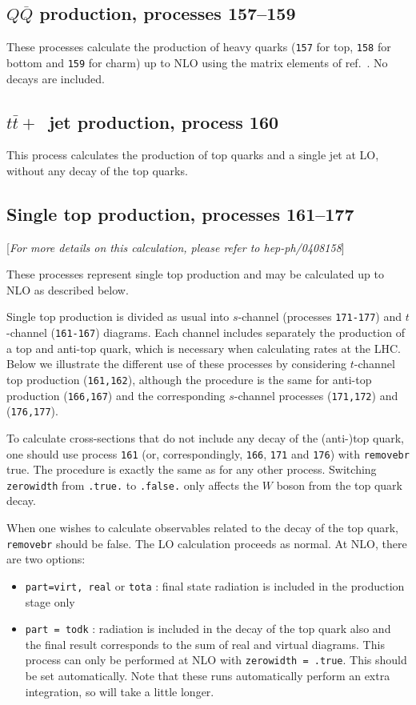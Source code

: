 \documentclass[12pt]{article}
\begin{document}
\subsection{$Q\overline{Q}$ production, processes 157--159}
These processes calculate the production of heavy quarks
({\tt 157} for top, {\tt 158} for bottom and {\tt 159} for charm) up to NLO 
using the matrix elements of ref.~\cite{Nason:1987xz}. No decays
are included.

\subsection{$t{\bar t}+$~jet production, process 160}
This process calculates the production of top quarks and a single jet
at LO, without any decay of the top quarks.

\subsection{Single top production, processes 161--177}
\label{subsec:stop}

\begin{center}
[{\it For more details on this calculation, please refer to hep-ph/0408158}]
\end{center}

These processes represent single top production and may be calculated up to
NLO as described below.

Single top production is divided as usual into $s$-channel 
(processes {\tt 171-177}) and $t$-channel ({\tt 161-167})
diagrams. Each channel includes separately the production of a top
and anti-top quark, which is necessary when calculating rates at the LHC.
Below we illustrate the different use of these processes by considering
$t$-channel top production ({\tt 161,162}), although the procedure is the same
for anti-top production ({\tt 166,167}) and the corresponding $s$-channel
processes ({\tt 171,172}) and ({\tt 176,177}).

To calculate cross-sections that do not include any decay of the (anti-)top
quark, one should use process {\tt 161}
(or, correspondingly, {\tt 166}, {\tt 171} and {\tt 176}) with {\tt removebr}
true. The procedure is exactly the same
as for any other process.
Switching {\tt zerowidth} from {\tt .true.} to {\tt .false.} only affects
the $W$ boson from the top quark decay.


When one wishes to calculate observables related to the decay of the top
quark, {\tt removebr} should be false.
The LO calculation proceeds as normal. At NLO, there are two options:
\begin{itemize}
\item {\tt part=virt, real} or {\tt tota} : final state radiation is included
in the production stage only
\item {\tt part = todk} : radiation is included in the decay of the top
quark also and the final result corresponds to the sum of real and virtual
diagrams. This process can only be performed at NLO with 
{\tt zerowidth = .true}. This should be set automatically.
Note that these runs automatically perform an extra integration, so
will take a little longer.
\end{itemize}
\end{document}
